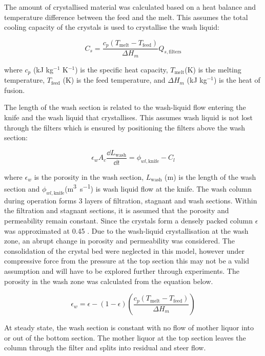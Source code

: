 The amount of crystallised material was calculated based on a heat balance and temperature difference between the feed and the melt. This assumes the total cooling capacity of the crystals is used to crystallise the wash liquid:

\begin{equation}
C_s= \frac{c_p(T_{\mathrm{melt}}-T_{\mathrm{feed}})}{\Delta H_m}Q_{s,\mathrm{filters}}
\end{equation}

\noindent where $c_p$ (kJ kg$^{-1}$ K$^{-1}$) is the specific heat capacity, $T_{\mathrm{melt}} $(K) is the melting temperature, $T_{\mathrm{feed}}$ (K) is the feed temperature, and $\Delta H_m$ (kJ kg$^{-1}$) is the heat of fusion. 

The length of the wash section is related to the wash-liquid flow entering the knife and the wash liquid that crystallises. This assumes wash liquid is not lost through the filters which is ensured by positioning the filters above the wash section:

\begin{equation}
\epsilon_w A_c \frac{\dd L_{\mathrm{wash}}}{\dd t}= \phi_{wl,\mathrm{knife}}-C_l
\end{equation}

\noindent where $\epsilon_w$ is the porosity in the wash section, $L_{\mathrm{wash}}$ (m) is the length of the wash section and $\phi_{wl,\mathrm{knife}} $(\si{\cubic\m\per\s}) is wash liquid flow at the knife. 
The wash column during operation forms 3 layers of filtration, stagnant and wash sections. Within the filtration and stagnant sections, it is assumed that the porosity and permeability remain constant. Since the crystals form a densely packed column $\epsilon$ was approximated at 0.45 \cite{jansens_furification_1995}. Due to the wash-liquid crystallisation at the wash zone, an abrupt change in porosity and permeability was considered. The consolidation of the crystal bed were neglected in this model, however under compressive force from the pressure at the top section this may not be a valid assumption and will have to be explored further through experiments. The porosity in the wash zone was calculated from the equation below. 

\begin{equation}
\epsilon_{w}= \epsilon-(1-\epsilon)\left(\frac{c_p(T_{\mathrm{melt}}-T_{\mathrm{feed}})}{\Delta H_m}\right)
\end{equation}

At steady state, the wash section is constant with no flow of mother liquor into or out of the bottom section. The mother liquor at the top section leaves the column through the filter and splits into residual and steer flow. 

